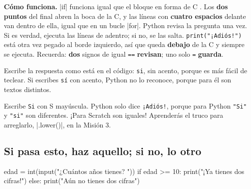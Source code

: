 \textbf{Cómo funciona.} \py|if| funciona igual que el bloque en forma de C . Los \textbf{dos puntos} del final abren la boca de la C, y las líneas con \textbf{cuatro espacios} delante van dentro de ella, igual que en un bucle \py|for|. Python revisa la pregunta una vez. Si es verdad, ejecuta las líneas de adentro; si no, se las salta. \texttt{print("¡Adiós!")} está otra vez pegado al borde izquierdo, así que queda \textbf{debajo} de la C y siempre se ejecuta. Recuerda: \textbf{dos} signos de igual \texttt{==} \textbf{revisan}; uno solo \texttt{=} \textbf{guarda}.

Escribe la respuesta como está en el código: \texttt{si}, sin acento, porque es más fácil de teclear. Si escribes \texttt{sí} con acento, Python no lo reconoce, porque para él son textos distintos.

\begin{watchout}
Escribe \texttt{Si} con S mayúscula. Python solo dice \texttt{¡Adiós!}, porque para Python \texttt{"Si"} y \texttt{"si"} son diferentes. ¡Para Scratch son iguales! Aprenderás el truco para arreglarlo, \py|.lower()|, en la Misión 3.
\end{watchout}

\subsection*{Si pasa esto, haz aquello; si no, lo otro}

\begin{tcbraster}[raster columns=2, raster equal height=rows, raster column skip=12pt, raster valign=center, raster force size=false, raster column 1/.style={width=0.36\linewidth}, raster column 2/.style={width=0.64\linewidth-12pt}]
\begin{tcolorbox}[colback=white, colframe=white, boxrule=0pt, valign=center, left=0pt, right=0pt]
\begin{scratch}[scale=0.69]
\end{scratch}
\end{tcolorbox}
\begin{code}
edad = int(input("¿Cuántos años tienes? "))
if edad >= 10:
    print("¡Ya tienes dos cifras!")
else:
    print("Aún no tienes dos cifras")
\end{code}
\end{tcbraster}

